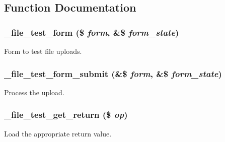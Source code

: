 \subsection{Function Documentation}
\hypertarget{file__test_8module_a655f98b0e48e5f05b6bd0d7171bd7388}{
\subsubsection[{\_\-file\_\-test\_\-form}]{\setlength{\rightskip}{0pt plus 5cm}\_\-file\_\-test\_\-form (\$ {\em form}, \/  \&\$ {\em form\_\-state})}}
\label{file__test_8module_a655f98b0e48e5f05b6bd0d7171bd7388}
Form to test file uploads. \hypertarget{file__test_8module_a9b7757f4f5643b488de8a846328c991d}{
\subsubsection[{\_\-file\_\-test\_\-form\_\-submit}]{\setlength{\rightskip}{0pt plus 5cm}\_\-file\_\-test\_\-form\_\-submit (\&\$ {\em form}, \/  \&\$ {\em form\_\-state})}}
\label{file__test_8module_a9b7757f4f5643b488de8a846328c991d}
Process the upload. \hypertarget{file__test_8module_a7102eea8d64b4742d521968ca7653bdd}{
\subsubsection[{\_\-file\_\-test\_\-get\_\-return}]{\setlength{\rightskip}{0pt plus 5cm}\_\-file\_\-test\_\-get\_\-return (\$ {\em op})}}
\label{file__test_8module_a7102eea8d64b4742d521968ca7653bdd}
Load the appropriate return value.


